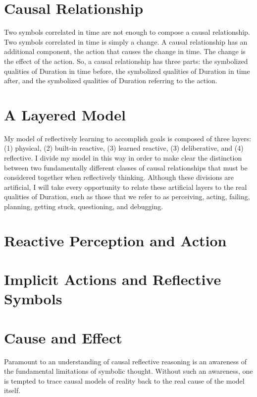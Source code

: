 \section{Causal Relationship}

Two symbols correlated in time are not enough to compose a causal
relationship.  Two symbols correlated in time is simply a change.  A
causal relationship has an additional component, the action that
causes the change in time.  The change is the effect of the action.
So, a causal relationship has three parts: the symbolized qualities of
Duration in time before, the symbolized qualities of Duration in time
after, and the symbolized qualities of Duration referring to the
action.

\section{A Layered Model}

My model of reflectively learning to accomplish goals is composed of
three layers: (1) physical, (2) built-in reactive, (3) learned
reactive, (3) deliberative, and (4) reflective.  I divide my model in
this way in order to make clear the distinction between two
fundamentally different classes of causal relationships that must be
considered together when reflectively thinking.  Although these
divisions are artificial, I will take every opportunity to relate
these artificial layers to the real qualities of Duration, such as
those that we refer to as perceiving, acting, failing, planning,
getting stuck, questioning, and debugging.

\section{Reactive Perception and Action}



\section{Implicit Actions and Reflective Symbols}



\section{Cause and Effect}

Paramount to an understanding of causal reflective reasoning is an
awareness of the fundamental limitations of symbolic thought.  Without
such an awareness, one is tempted to trace causal models of reality
back to the real cause of the model itself.  

